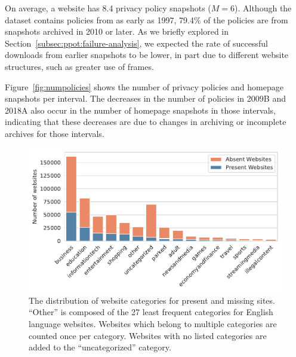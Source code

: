 On average, a website has 8.4 privacy policy snapshots ($M=6$). Although the dataset contains policies from as early as 1997, 79.4\% of the policies are from snapshots archived in 2010 or later.
As we briefly explored in Section~\ref{subsec:ppot:failure-analysis}, we expected the rate of successful downloads from earlier snapshots to be lower, in part due to different website structures, such as greater use of frames.

Figure~\ref{fig:numpolicies} shows the number of privacy policies and homepage snapshots per interval.
The decreases in the number of policies in 2009B and 2018A also occur in the number of homepage snapshots in those intervals, indicating that these decreases are due to changes in archiving or incomplete archives for those intervals.

\begin{figure}[t]
\centering
\includegraphics[width=1\columnwidth]{chapters/privacypolicies/figures/category_dist.pdf}

\caption{The distribution of website categories for present and missing sites. ``Other'' is composed of the 27 least frequent categories for English language websites. Websites which belong to multiple categories are counted once per category. Websites with no listed categories are added to the ``uncategorized'' category.}
\label{fig:cat_dist}
\end{figure}


